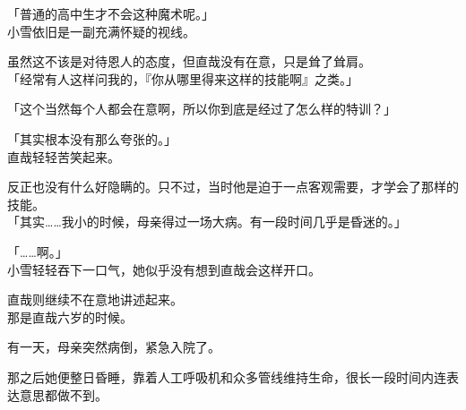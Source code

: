 「普通的高中生才不会这种魔术呢。」\\

小雪依旧是一副充满怀疑的视线。

虽然这不该是对待恩人的态度，但直哉没有在意，只是耸了耸肩。\\

「经常有人这样问我的，『你从哪里得来这样的技能啊』之类。」

「这个当然每个人都会在意啊，所以你到底是经过了怎么样的特训？」

「其实根本没有那么夸张的。」\\

直哉轻轻苦笑起来。

反正也没有什么好隐瞒的。只不过，当时他是迫于一点客观需要，才学会了那样的技能。\\

「其实……我小的时候，母亲得过一场大病。有一段时间几乎是昏迷的。」

「……啊。」\\

小雪轻轻吞下一口气，她似乎没有想到直哉会这样开口。

直哉则继续不在意地讲述起来。\\

那是直哉六岁的时候。

有一天，母亲突然病倒，紧急入院了。

那之后她便整日昏睡，靠着人工呼吸机和众多管线维持生命，很长一段时间内连表达意思都做不到。\\

